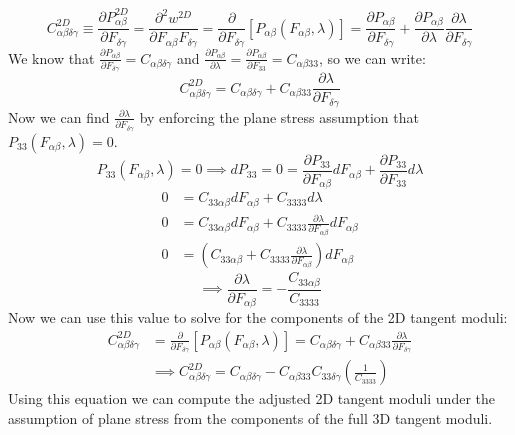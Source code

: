 \documentclass[]{spie}  %
\begin{document}
\begin{equation}
C^{2D}_{\alpha\beta\delta\gamma}	\equiv \frac{\partial P^{2D}_{\alpha\beta}}{\partial F_{\delta\gamma}} =
										\frac{\partial^2 w^{2D}}{\partial F_{\alpha\beta}F_{\delta\gamma}} =
										\frac{\partial}{\partial F_{\delta\gamma}} \left[P_{\alpha\beta}(F_{\alpha\beta}, \lambda)\right] =
										\frac{\partial P_{\alpha\beta}}{\partial F_{\delta\gamma}} + \frac{\partial P_{\alpha\beta}}{\partial \lambda} \frac{\partial \lambda}{\partial F_{\delta\gamma}}
\end{equation}
We know that $\frac{\partial P_{\alpha\beta}}{\partial F_{\delta\gamma}} = C_{\alpha\beta\delta\gamma}$ and $\frac{\partial P_{\alpha\beta}}{\partial \lambda} = \frac{\partial P_{\alpha\beta}}{\partial F_{33}} = C_{\alpha\beta 3 3}$, so we can write:
\begin{equation}
C^{2D}_{\alpha\beta\delta\gamma} = C_{\alpha\beta\delta\gamma} + C_{\alpha\beta 3 3} \frac{\partial \lambda}{\partial F_{\delta\gamma}}
\end{equation}
Now we can find $\frac{\partial \lambda}{\partial F_{\delta\gamma}}$ by enforcing the plane stress assumption that $P_{33}(F_{\alpha\beta}, \lambda) = 0$. 
\begin{equation}
P_{33}(F_{\alpha\beta}, \lambda) = 0 \implies dP_{33} = 0 = \frac{\partial P_{33}}{\partial F_{\alpha\beta}} dF_{\alpha\beta} + \frac{\partial P_{33}}{\partial F_{33}} d\lambda
\end{equation}
\begin{align}
0 &= C_{3 3 \alpha\beta} dF_{\alpha\beta} + C_{3333} d\lambda \\
0 &= C_{3 3 \alpha\beta} dF_{\alpha\beta} + C_{3333} \frac{\partial \lambda}{\partial F_{\alpha\beta}} dF_{\alpha\beta} \\
0 &= \left( C_{3 3 \alpha\beta} + C_{3333} \frac{\partial \lambda}{\partial F_{\alpha\beta}} \right) dF_{\alpha\beta}
\end{align}
\begin{equation}
\implies \frac{\partial \lambda}{\partial F_{\alpha\beta}} = - \frac{C_{3 3 \alpha\beta}}{C_{3333}}
\end{equation}
Now we can use this value to solve for the components of the 2D tangent moduli:
\begin{align}
C^{2D}_{\alpha\beta\delta\gamma} &= \frac{\partial}{\partial F_{\delta\gamma}} \left[ P_{\alpha\beta}(F_{\alpha\beta},
									\lambda)\right] = C_{\alpha\beta\delta\gamma} + C_{\alpha\beta 3 3} \frac{\partial \lambda}{\partial F_{\delta\gamma}} \\
& \implies C^{2D}_{\alpha\beta\delta\gamma} = C_{\alpha\beta\delta\gamma} - C_{\alpha\beta 3 3} C_{3 3 \delta\gamma} \left(\frac{1}{C_{3333}}\right)
\label{eq: 2d tangent moduli}
\end{align}
Using this equation we can compute the adjusted 2D tangent moduli under the assumption of plane stress from the components of the full 3D tangent moduli. 
\end{document}
